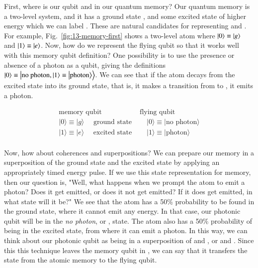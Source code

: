 First, where is our qubit  and  in our quantum memory? Our quantum memory is a two-level system, and it has a ground state , and some excited state of higher energy which we can label . These are natural candidates for representing  and . For example, Fig.~\ref{fig:13-memory-first} shows a two-level atom where $\left| 0 \right\rangle\equiv\left| g \right\rangle$ and $\left| 1 \right\rangle\equiv\left| e \right\rangle$. Now, how do we represent the flying qubit so that it works well with this memory qubit definition? One possibility is to use the presence or absence of a photon as a qubit, giving the definitions $\left| 0 \right\rangle\equiv\left| \textrm{no photon},\left| 1 \right\rangle\equiv\left| \textrm{photon} \right\rangle \right\rangle$.
We can see that if the atom decays from the excited state into its ground state, that is, it makes a transition from  to , it emits a photon.

\begin{equation}
\begin{array}{ll}
\text{memory qubit} & \text{flying qubit} \\

|0\rangle \equiv|g\rangle \quad \text { ground state } & \quad|0\rangle \equiv \mid \text {no photon}\rangle \\
|1\rangle \equiv|e\rangle \quad \text { excited state } & \quad|1\rangle \equiv \mid \text {photon}\rangle \\
\end{array}
\end{equation}

Now, how about coherences and superpositions? We can prepare our memory in a superposition of the ground state and the excited state by applying an appropriately timed energy pulse. If we use this state representation for memory, then our question is, "Well, what happens when we prompt the atom to emit a photon? Does it get emitted, or does it not get emitted? If it does get emitted, in what state will it be?" We see that the atom has a 50\% probability to be found in the ground state, where it cannot emit any energy. In that case, our photonic qubit will be in the \emph{no photon}, or , state. The atom also has a 50\% probability of being in the excited state, from where it can emit a photon. In this way, we can think about our photonic qubit as being in a superposition of  and , or  and .
Since this this technique leaves the memory qubit in , we can say that it transfers the state \ket{+} from the atomic memory to the flying qubit. 

